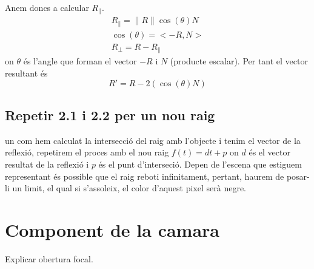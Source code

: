 \documentclass{article}
\begin{document}
Anem doncs a calcular $R_{\parallel}$.
\begin{align} 
   R_{\parallel}=\|R\| \cos(\theta)  N \\
   \cos(\theta) = <-R , N> \\
   R_{\bot}= R-R_{\parallel}
\end{align}
on $\theta$ és l'angle que forman el vector  $-R$ i  $N$ (producte escalar).
Per tant el vector resultant és
\begin{equation*}
   R'= R-2(\cos(\theta)N)
\end{equation*}

\subsection{Repetir 2.1 i 2.2 per un nou raig}
un com hem calculat la intersecció del raig amb l'objecte i tenim el vector de la reflexió, repetirem el proces amb el nou raig
$f(t)=dt+p$ on  $d$ és el vector resultat de la reflexió i  $p$ és el punt d'interseció. Depen de l'escena que estiguem
representant és possible que el raig reboti infinitament, pertant, haurem de posar-li un limit, el qual si s'assoleix, el color
d'aquest pixel serà negre.
\section{Component de la camara}
Explicar obertura focal.
\end{document}
